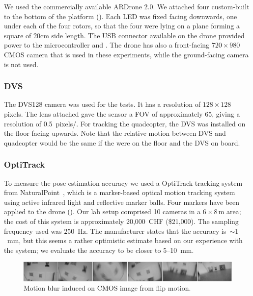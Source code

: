 We used the commercially available ARDrone 2.0. We attached four
custom-built \ALMs to the bottom of the platform ().
Each LED was fixed facing downwards, one under each of the four rotors,
so that the four were lying on a plane forming a square of 20cm side
length. The USB connector available on the drone provided power to
the microcontroller and \ALMs. The drone has also a front-facing
$720\times980$ CMOS camera that is used in these experiments, while
the ground-facing camera is not used.


\subsubsection{DVS}

The DVS128 camera was used for the tests. It has a resolution of $128\times128$
pixels. The lens attached gave the sensor a FOV of approximately 65\textdegree{},
giving a resolution of 0.5~pixels/\textdegree{}. For tracking the
quadcopter, the DVS was installed on the floor facing upwards. Note
that the relative motion between DVS and quadcopter would be the same
if the \ALMs were on the floor and the DVS on board.


\subsubsection{OptiTrack}

To measure the pose estimation accuracy we used a OptiTrack tracking
system from NaturalPoint~\cite{optitrack}, which is a marker-based
optical motion tracking system using active infrared light and reflective
marker balls. Four markers have been applied to the drone ().
Our lab setup comprised 10 cameras in a $6\times8\,\mbox{m}$ area;
the cost of this system is approximately 20,000~CHF (\$21,000). The
sampling frequency used was $250$~Hz. The manufacturer states that
the accuracy is~$\sim1$~mm, but this seems a rather optimistic
estimate based on our experience with the system; we evaluate the
accuracy to be closer to 5--10~mm.



\begin{figure}
\begin{centering}

\par\end{centering}

\begin{centering}
\includegraphics[width=17cm]{figures/slides/flip_sequence_small}
\par\end{centering}

\caption{\label{fig:Motion-blur-induced}Motion blur induced on CMOS image
from flip motion.}
\end{figure}



